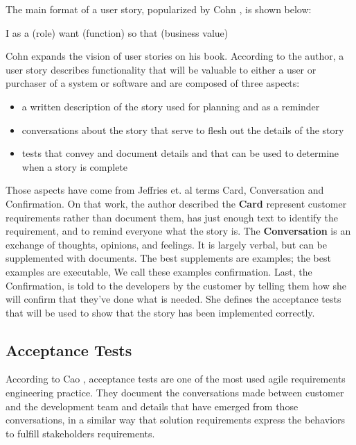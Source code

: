 The main format of a user story, popularized by Cohn \cite{Cohn_2004}, is shown below:

\begin{framed}

\center I as a (role) want (function) so that (business value)

\end{framed}

Cohn \cite{Cohn_2004} expands the vision of user stories on his book. According to the author, a user story describes functionality that will be valuable to either a user or purchaser of a system or software and are composed of three aspects:

\begin{itemize}
    \item a written description of the story used for planning and as a reminder
    \item conversations about the story that serve to flesh out the details of the story
    \item tests that convey and document details and that can be used to determine when a story is complete
\end{itemize}

Those aspects have come from Jeffries et. al \cite{Jeffries_2001} terms Card, Conversation and Confirmation. On that work, the author described the \textbf{Card} represent customer requirements rather than document them, has just enough text to identify the requirement, and to remind everyone what the story is. The \textbf{Conversation} is an exchange of thoughts, opinions, and feelings. It is largely verbal, but can be supplemented with documents. The best supplements are examples; the best examples are executable, We call these examples confirmation. Last, the Confirmation, is told to the developers by the customer by telling them how she will confirm that they've done what is needed. She defines the acceptance tests that will be used to show that the story has been implemented correctly.

\subsection{Acceptance Tests}

According to Cao \cite{Cao_2008}, acceptance tests are one of the most used agile requirements engineering practice. They document the conversations made between customer and the development team and details that have emerged from those conversations, in a similar way that solution requirements express the behaviors to fulfill stakeholders requirements. 

